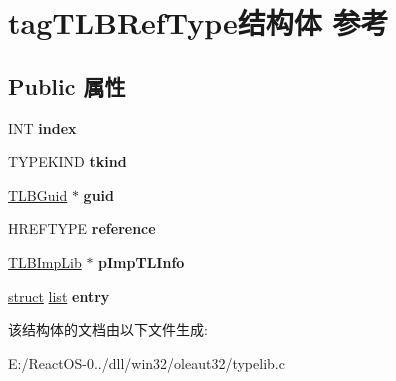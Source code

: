 \hypertarget{structtag_t_l_b_ref_type}{}\section{tag\+T\+L\+B\+Ref\+Type结构体 参考}
\label{structtag_t_l_b_ref_type}
\subsection*{Public 属性}
\begin{DoxyCompactItemize}
\item 
\mbox{\label{structtag_t_l_b_ref_type_a6a58b32ddd383a848b6706f1857886a3}} 
I\+NT {\bfseries index}
\item 
\mbox{\label{structtag_t_l_b_ref_type_ac974d44ab4a0b7aef398d88a9e68f218}} 
T\+Y\+P\+E\+K\+I\+ND {\bfseries tkind}
\item 
\mbox{\label{structtag_t_l_b_ref_type_a0cdd9b22e5db2f7538ffdfd7456319ae}} 
\hyperlink{structtag_t_l_b_guid}{T\+L\+B\+Guid} $\ast$ {\bfseries guid}
\item 
\mbox{\label{structtag_t_l_b_ref_type_a9d79373636e62e8ba706af794b6a7076}} 
H\+R\+E\+F\+T\+Y\+PE {\bfseries reference}
\item 
\mbox{\label{structtag_t_l_b_ref_type_ab99cdac16441b063a8cc3454a490f058}} 
\hyperlink{structtag_t_l_b_imp_lib}{T\+L\+B\+Imp\+Lib} $\ast$ {\bfseries p\+Imp\+T\+L\+Info}
\item 
\mbox{\label{structtag_t_l_b_ref_type_accb44d0adbea60e44efe044212ab33ab}} 
\hyperlink{interfacestruct}{struct} \hyperlink{classlist}{list} {\bfseries entry}
\end{DoxyCompactItemize}


该结构体的文档由以下文件生成\+:\begin{DoxyCompactItemize}
\item 
E\+:/\+React\+O\+S-\/0../dll/win32/oleaut32/typelib.\+c\end{DoxyCompactItemize}
